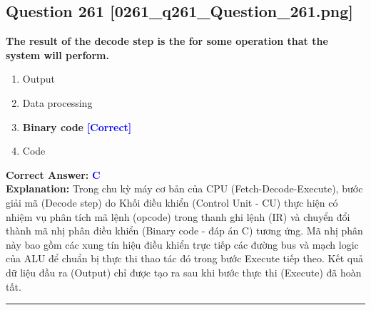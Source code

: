 \documentclass[11pt,a4paper]{article}
\begin{document}
\begin{minipage}{\textwidth}
\subsection*{Question 261 \quad \footnotesize{[0261\_q261\_Question\_261.png]}}
\noindent \textbf{The result of the decode step is the for some operation that the system will perform.}

\begin{enumerate}[label=\Alph*.]
    \item Output
    \item Data processing
    \item \textbf{Binary code} \hfill \textcolor{blue}{\textbf{[Correct]}}
    \item Code
\end{enumerate}

\noindent \textbf{Correct Answer:} \textcolor{blue}{\textbf{C}} \\[2pt]
\noindent \textbf{Explanation:} Trong chu kỳ máy cơ bản của CPU (Fetch-Decode-Execute), bước giải mã (Decode step) do Khối điều khiển (Control Unit - CU) thực hiện có nhiệm vụ phân tích mã lệnh (opcode) trong thanh ghi lệnh (IR) và chuyển đổi thành mã nhị phân điều khiển (Binary code - đáp án C) tương ứng. Mã nhị phân này bao gồm các xung tín hiệu điều khiển trực tiếp các đường bus và mạch logic của ALU để chuẩn bị thực thi thao tác đó trong bước Execute tiếp theo. Kết quả dữ liệu đầu ra (Output) chỉ được tạo ra sau khi bước thực thi (Execute) đã hoàn tất.

\par\vspace{0.3cm}
\hrule
\vspace{0.3cm}
\end{minipage}
\end{document}
